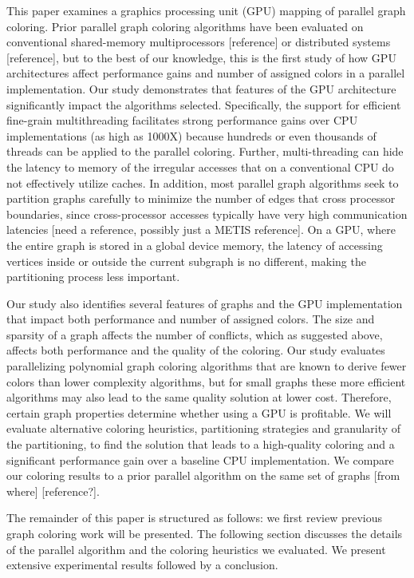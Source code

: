 \documentclass[preprint]{sigplanconf}
\begin{document}
This paper examines a graphics processing unit (GPU) mapping of parallel graph coloring.  Prior parallel graph coloring algorithms have been evaluated on conventional shared-memory multiprocessors [reference] or distributed systems [reference], but to the best of our knowledge, this is the first study of how GPU architectures affect performance gains and number of assigned colors in a parallel implementation.  Our study demonstrates that features of the GPU architecture significantly impact the algorithms selected.  Specifically, the support for efficient fine-grain multithreading facilitates strong performance gains over CPU implementations (as high as 1000X) because hundreds or even thousands of threads can be applied to the parallel coloring.  Further, multi-threading can hide the latency to memory of the irregular accesses that on a conventional CPU do not effectively utilize caches.  In addition, most parallel graph algorithms seek to partition graphs carefully to minimize the number of edges that cross processor boundaries, since cross-processor accesses typically have very high communication latencies [need a reference, possibly just a METIS reference].  On a GPU, where the entire graph is stored in a global device memory, the latency of accessing vertices inside or outside the current subgraph is no different, making the partitioning process less important.  \citet{smith02}

Our study also identifies several features of graphs and the GPU implementation that impact both performance and number of assigned colors.  The size and sparsity of a graph affects the number of conflicts, which as suggested above, affects both performance and the quality of the coloring.  Our study evaluates parallelizing polynomial graph coloring algorithms that are known to derive fewer colors than lower complexity algorithms, but for small graphs these more efficient algorithms may also lead to the same quality solution at lower cost.  Therefore, certain graph properties determine whether using a GPU is profitable.  We will evaluate alternative coloring heuristics, partitioning strategies and granularity of the partitioning, to find the solution that leads to a high-quality coloring and a significant performance gain over a baseline CPU implementation.  We compare our coloring results to a prior parallel algorithm on the same set of graphs [from where] [reference?].

The remainder of this paper is structured as follows: we first review previous graph coloring work will be presented.  The following section discusses the details of the parallel algorithm and the coloring heuristics we evaluated.  We present extensive experimental results followed by a conclusion.
\end{document}
